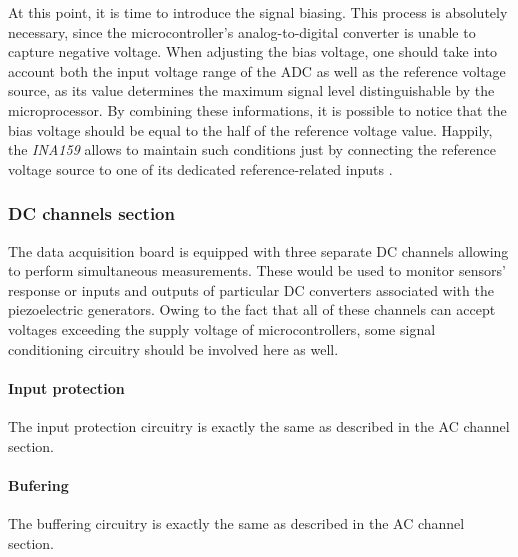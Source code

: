 \documentclass[12pt,a4paper]{article}
\begin{document}
At this point, it is time to introduce the signal biasing. This process is absolutely necessary, since the microcontroller's analog-to-digital converter is unable to capture negative voltage. When adjusting the bias voltage, one should take into account both the input voltage range of the ADC as well as the reference voltage source, as its value determines the maximum signal level distinguishable by the microprocessor. By combining these informations, it is possible to notice that the bias voltage should be equal to the half of the reference voltage value. Happily, the \textit{INA159} allows to maintain such conditions just by connecting the reference voltage source to one of its dedicated reference-related inputs \cite{ina159_params}.

\subsubsection{DC channels section}
The data acquisition board is equipped with three separate DC channels allowing to perform simultaneous measurements. These would be used to monitor sensors' response or inputs and outputs of particular DC converters associated with the piezoelectric generators. Owing to the fact that all of these channels can accept voltages exceeding the supply voltage of microcontrollers, some signal conditioning circuitry should be involved here as well.
\paragraph{Input protection}
The input protection circuitry is exactly the same as described in the AC channel section.
\paragraph{Bufering}
The buffering circuitry is exactly the same as described in the AC channel section.
\end{document}
